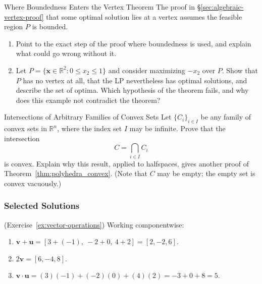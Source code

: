 \begin{ex}{Where Boundedness Enters the Vertex Theorem}{}
\label{ex:boundedness-vertex}
The proof in \S\ref{sec:algebraic-vertex-proof} that some optimal solution lies at a vertex assumes the feasible region \( P \) is bounded.
\begin{enumerate}
    \item Point to the exact step of the proof where boundedness is used, and explain what could go wrong without it.
    \item Let \( P = \{ \mathbf{x} \in \mathbb{R}^2 : 0 \leq x_2 \leq 1 \} \) and consider maximizing \( -x_2 \) over \( P \). Show that \( P \) has no vertex at all, that the LP nevertheless has optimal solutions, and describe the set of optima. Which hypothesis of the theorem fails, and why does this example not contradict the theorem?
\end{enumerate}
\exrefs{\S\ref{sec:algebraic-vertex-proof}}
\end{ex}


\begin{ex}{Intersections of Arbitrary Families of Convex Sets}{}
\label{ex:intersection-family}
Let \( \{ C_i \}_{i \in I} \) be any family of convex sets in \( \mathbb{R}^n \), where the index set \( I \) may be infinite. Prove that the intersection
\[
C = \bigcap_{i \in I} C_i
\]
is convex. Explain why this result, applied to halfspaces, gives another proof of Theorem~\ref{thm:polyhedra_convex}. (Note that \( C \) may be empty; the empty set is convex vacuously.)
\end{ex}

\subsubsection*{Selected Solutions}

\begin{solution}(Exercise~\ref{ex:vector-operations})
Working componentwise:
\begin{enumerate}
    \item \( \mathbf{v} + \mathbf{u} = [3 + (-1),\ -2 + 0,\ 4 + 2] = [2, -2, 6] \).
    \item \( 2\mathbf{v} = [6, -4, 8] \).
    \item \( \mathbf{v} \cdot \mathbf{u} = (3)(-1) + (-2)(0) + (4)(2) = -3 + 0 + 8 = 5 \).
\end{enumerate}
\end{solution}

